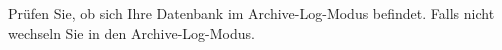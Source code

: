       \item Prüfen Sie, ob sich Ihre Datenbank im Archive-Log-Modus befindet. Falls nicht wechseln Sie in den Archive-Log-Modus.
